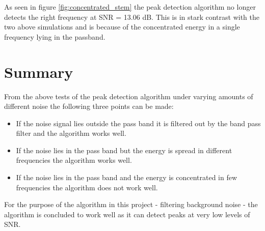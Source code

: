 As seen in figure \ref{fig:concentrated_stem} the peak detection algorithm no longer detects the right frequency at SNR = 13.06 dB. This is in stark contrast with the two above simulations and is because of the concentrated energy in a single frequency lying in the passband.

\section{Summary}
From the above tests of the peak detection algorithm under varying amounts of different noise the following three points can be made:
\begin{itemize}
\item If the noise signal lies outside the pass band it is filtered out by the band pass filter and the algorithm works well.
\item If the noise lies in the pass band but the energy is spread in different frequencies the algorithm works well.
\item If the noise lies in the pass band and the energy is concentrated in few frequencies the algorithm does not work well.
\end{itemize}
For the purpose of the algorithm in this project - filtering background noise - the algorithm is concluded to work well as it can detect peaks at very low levels of SNR.